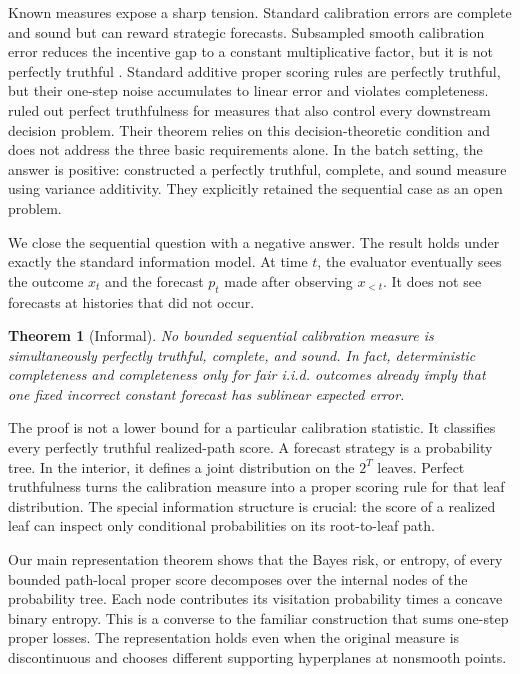 \documentclass{article}
\newtheorem{theorem}{Theorem}
\theoremstyle{definition}
\theoremstyle{remark}
\newcommand{\1}{\mathbf 1}
\begin{document}
Known measures expose a sharp tension. Standard calibration errors are complete and sound but can reward strategic forecasts. Subsampled smooth calibration error reduces the incentive gap to a constant multiplicative factor, but it is not perfectly truthful \citep{haghtalab2024truthfulness}. Standard additive proper scoring rules are perfectly truthful, but their one-step noise accumulates to linear error and violates completeness. \citet{qiao2025decision} ruled out perfect truthfulness for measures that also control every downstream decision problem. Their theorem relies on this decision-theoretic condition and does not address the three basic requirements alone. In the batch setting, the answer is positive: \citet{hartline2026perfect} constructed a perfectly truthful, complete, and sound measure using variance additivity. They explicitly retained the sequential case as an open problem.

We close the sequential question with a negative answer. The result holds under exactly the standard information model. At time \(t\), the evaluator eventually sees the outcome \(x_t\) and the forecast \(p_t\) made after observing \(x_{<t}\). It does not see forecasts at histories that did not occur.

\begin{theorem}[Informal]\label{thm:informal}
No bounded sequential calibration measure is simultaneously perfectly truthful, complete, and sound. In fact, deterministic completeness and completeness only for fair i.i.d. outcomes already imply that one fixed incorrect constant forecast has sublinear expected error.
\end{theorem}

The proof is not a lower bound for a particular calibration statistic. It classifies every perfectly truthful realized-path score. A forecast strategy is a probability tree. In the interior, it defines a joint distribution on the \(2^T\) leaves. Perfect truthfulness turns the calibration measure into a proper scoring rule for that leaf distribution. The special information structure is crucial: the score of a realized leaf can inspect only conditional probabilities on its root-to-leaf path.

Our main representation theorem shows that the Bayes risk, or entropy, of every bounded path-local proper score decomposes over the internal nodes of the probability tree. Each node contributes its visitation probability times a concave binary entropy. This is a converse to the familiar construction that sums one-step proper losses. The representation holds even when the original measure is discontinuous and chooses different supporting hyperplanes at nonsmooth points.
\end{document}
